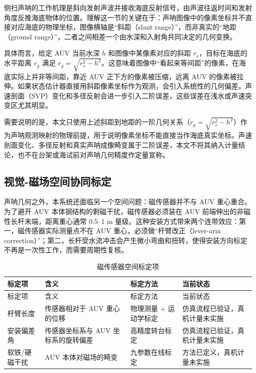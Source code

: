 侧扫声呐的工作机理是斜向发射声波并接收海底反射信号，由声波往返时间和发射角度反推海底物体的位置\cite{wunderlich2016burial}。理解这一节的关键在于：声呐图像中的像素坐标并不直接对应海底的物理坐标，图像横轴是``斜距（slant range）''，而非真实的``地距（ground range）''，二者之间相差一个由水深和入射角共同决定的几何变换。

具体而言，给定 AUV 当前水深 \(h\) 和图像中某像素对应的斜距 \(r_s\)，目标在海底的水平距离 \(r_g\) 满足 \(r_g=\sqrt{r_s^2-h^2}\)。这意味着图像中``看起来等间距''的像素，在海底实际上并非等间距，靠近 AUV 正下方的像素被压缩，远离 AUV 的像素被拉伸。如果状态估计器直接用斜距像素坐标作为观测，会引入系统性的几何偏差。声速剖面（SVP）变化和多径反射会进一步引入二阶误差，这些误差在浅水或声速突变区尤其明显。

需要说明的是，本文只使用上述斜距到地距的一阶几何关系（\(r_g=\sqrt{r_s^2-h^2}\)）作为声呐观测映射的物理前提，用于说明像素坐标不能直接当作海底真实坐标。声速剖面变化、多径反射和真实声呐成像畸变属于二阶误差，本文不将其纳入计量结论，也不在台架或海试前对声呐几何精度作定量宣称。

\subsection{视觉-磁场空间协同标定}\label{sec:ch02-2-4-2}

声呐几何之外，本系统还面临另一个空间问题：磁传感器并不与 AUV 重心重合。为了避开 AUV 本体钢结构的剩磁干扰，磁传感器必须装在 AUV 前端伸出的非磁性长杆末端，距离重心通常 0.5--1 m 量级。这种安装方式带来两个连带效应：第一，磁传感器实际测量点不在 AUV 重心，必须做``杆臂改正（lever-arm correction）''；第二，长杆受水流冲击会产生微小弯曲和扭转，使得安装方向标定不再是一次性工作，而需要周期性复核。

\begin{longtable}[]{@{}
  >{\raggedright\arraybackslash}p{}
  >{\raggedright\arraybackslash}p{}
  >{\raggedright\arraybackslash}p{}
  >{\raggedright\arraybackslash}p{}@{}}
\caption{磁传感器空间标定项}\label{tab:ch02-calibration}\tabularnewline
\toprule\noalign{}
标定项 & 含义 & 标定方法 & 当前状态 \\
\midrule\noalign{}
\endfirsthead
\toprule\noalign{}
标定项 & 含义 & 标定方法 & 当前状态 \\
\midrule\noalign{}
\endhead
\bottomrule\noalign{}
\endlastfoot
杆臂长度 & 传感器相对于 AUV 重心的位移 & 物理测量 + 运动学标定 & 仿真流程已验证，真机计量未实施 \\
安装偏差角 & 传感器坐标系与 AUV 坐标系的旋转偏差 & 高精度转台标定 & 仿真流程已验证，真机计量未实施 \\
软铁/硬磁干扰 & AUV 本体对磁场的畸变 & 九参数在线标定 & 方法已定义，真机计量未实施 \\
\end{longtable}

